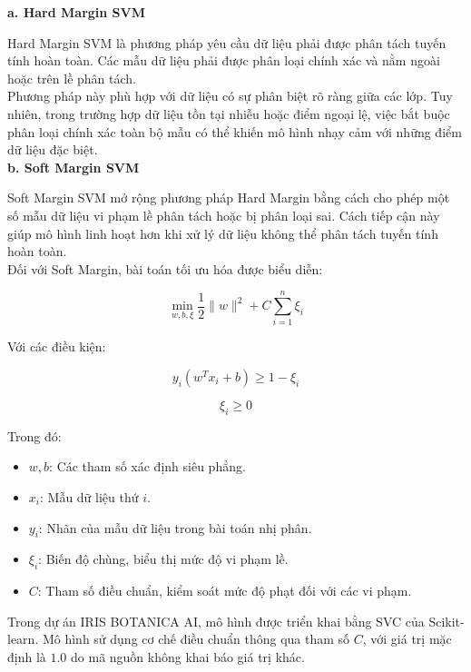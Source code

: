 \documentclass[14pt]{extarticle}
\begin{document}
		\noindent
		\textbf{a. Hard Margin SVM}
		
		\noindent Hard Margin SVM là phương pháp yêu cầu dữ liệu phải được phân tách tuyến tính hoàn toàn. Các mẫu dữ liệu phải được phân loại chính xác và nằm ngoài hoặc trên lề phân tách.\\
		
		\noindent
		Phương pháp này phù hợp với dữ liệu có sự phân biệt rõ ràng giữa các lớp. Tuy nhiên, trong trường hợp dữ liệu tồn tại nhiễu hoặc điểm ngoại lệ, việc bắt buộc phân loại chính xác toàn bộ mẫu có thể khiến mô hình nhạy cảm với những điểm dữ liệu đặc biệt.\\
		
		\noindent
		\textbf{b. Soft Margin SVM}
		
		\noindent
		Soft Margin SVM mở rộng phương pháp Hard Margin bằng cách cho phép một số mẫu dữ liệu vi phạm lề phân tách hoặc bị phân loại sai. Cách tiếp cận này giúp mô hình linh hoạt hơn khi xử lý dữ liệu không thể phân tách tuyến tính hoàn toàn.\\
		
		\noindent
		Đối với Soft Margin, bài toán tối ưu hóa được biểu diễn:
		
		\begin{equation*}
			\min_{w,b,\xi}
			\frac{1}{2}\|w\|^2
			+ C\sum_{i=1}^{n}\xi_i
		\end{equation*}
		
		\noindent
		Với các điều kiện:
		
		\begin{equation*}
			y_i(w^Tx_i+b)\geq 1-\xi_i
		\end{equation*}
		
		\begin{equation*}
			\xi_i\geq 0
		\end{equation*}
		
		\noindent
		Trong đó:
		\begin{itemize}
			\item $w,b$: Các tham số xác định siêu phẳng.
			\item $x_i$: Mẫu dữ liệu thứ $i$.
			\item $y_i$: Nhãn của mẫu dữ liệu trong bài toán nhị phân.
			\item $\xi_i$: Biến độ chùng, biểu thị mức độ vi phạm lề.
			\item $C$: Tham số điều chuẩn, kiểm soát mức độ phạt đối với các vi phạm.
		\end{itemize}
		
		\noindent
		Trong dự án IRIS BOTANICA AI, mô hình được triển khai bằng SVC của Scikit-learn. Mô hình sử dụng cơ chế điều chuẩn thông qua tham số $C$, với giá trị mặc định là $1.0$ do mã nguồn không khai báo giá trị khác.
\end{document}
